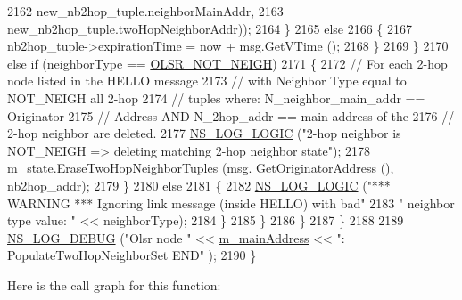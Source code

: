 \begin{DoxyCode}
2162                                                            new\_nb2hop\_tuple.neighborMainAddr,
2163                                                            new\_nb2hop\_tuple.twoHopNeighborAddr));
2164                     \}
2165                   \textcolor{keywordflow}{else}
2166                     \{
2167                       nb2hop\_tuple->expirationTime = now + msg.GetVTime ();
2168                     \}
2169                 \}
2170               \textcolor{keywordflow}{else} \textcolor{keywordflow}{if} (neighborType == \hyperlink{olsr-routing-protocol_8cc_a7ff690f7463019aec83c1f0edd911034}{OLSR\_NOT\_NEIGH})
2171                 \{
2172                   \textcolor{comment}{// For each 2-hop node listed in the HELLO message}
2173                   \textcolor{comment}{// with Neighbor Type equal to NOT\_NEIGH all 2-hop}
2174                   \textcolor{comment}{// tuples where: N\_neighbor\_main\_addr == Originator}
2175                   \textcolor{comment}{// Address AND N\_2hop\_addr == main address of the}
2176                   \textcolor{comment}{// 2-hop neighbor are deleted.}
2177                   \hyperlink{group__logging_ga88acd260151caf2db9c0fc84997f45ce}{NS\_LOG\_LOGIC} (\textcolor{stringliteral}{"2-hop neighbor is NOT\_NEIGH => deleting matching 2-hop
       neighbor state"});
2178                   \hyperlink{classns3_1_1olsr_1_1RoutingProtocol_a07942ec1a7df71b609c8d2ff3b567c49}{m\_state}.\hyperlink{classns3_1_1olsr_1_1OlsrState_a42bb2907567fb9ab9b17d28476c9859b}{EraseTwoHopNeighborTuples} (msg.
      GetOriginatorAddress (), nb2hop\_addr);
2179                 \}
2180               \textcolor{keywordflow}{else}
2181                 \{
2182                   \hyperlink{group__logging_ga88acd260151caf2db9c0fc84997f45ce}{NS\_LOG\_LOGIC} (\textcolor{stringliteral}{"*** WARNING *** Ignoring link message (inside HELLO) with bad"}
2183                                 \textcolor{stringliteral}{" neighbor type value: "} << neighborType);
2184                 \}
2185             \}
2186         \}
2187     \}
2188 
2189   \hyperlink{group__logging_ga413f1886406d49f59a6a0a89b77b4d0a}{NS\_LOG\_DEBUG} (\textcolor{stringliteral}{"Olsr node "} << \hyperlink{classns3_1_1olsr_1_1RoutingProtocol_a58cc50ed5d1039aab603e90e318aabfb}{m\_mainAddress} << \textcolor{stringliteral}{": PopulateTwoHopNeighborSet END"}
      );
2190 \}
\end{DoxyCode}


Here is the call graph for this function\+:




